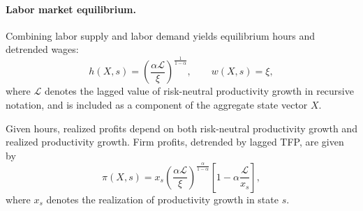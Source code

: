 


\paragraph{Labor market equilibrium.}

Combining labor supply and labor demand yields equilibrium hours and detrended wages:
\begin{equation}
h(X,s)
=
\left(
\frac{\alpha \mathcal L}{\xi}
\right)^{\frac{1}{1-\alpha}},
\qquad
w(X,s)
=
\xi,
\label{eq: hours_wages}
\end{equation}
where $\mathcal L$ denotes the lagged value of risk-neutral productivity growth in
recursive notation, and is included as a component of the aggregate state vector $X$.

Given hours, realized profits depend on both risk-neutral productivity growth
and realized productivity growth. Firm profits, detrended by lagged TFP, are given by
\[
\pi(X,s)
=
x_s
\left(
\frac{\alpha \mathcal L}{\xi}
\right)^{\frac{\alpha}{1-\alpha}}
\left[
1
-
\alpha
\frac{\mathcal L}{x_s}
\right],
\]
where $x_s$ denotes the realization of productivity growth in state $s$.

